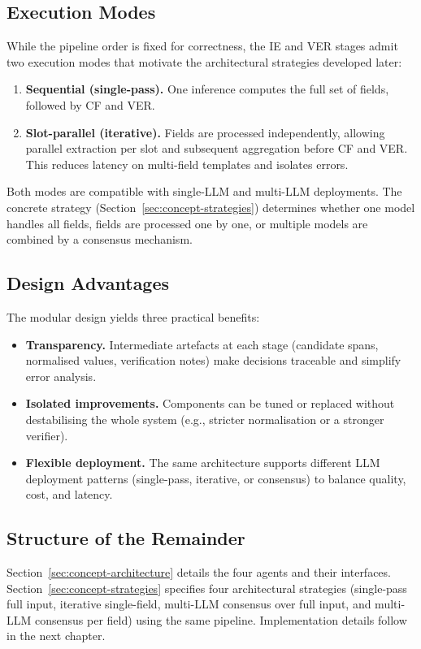 \subsection{Execution Modes}
While the pipeline order is fixed for correctness, the IE and VER stages admit two execution modes that motivate the architectural strategies developed later:
\begin{enumerate}
    \item \textbf{Sequential (single-pass).} One inference computes the full set of fields, followed by CF and VER.
    \item \textbf{Slot-parallel (iterative).} Fields are processed independently, allowing parallel extraction per slot and subsequent aggregation before CF and VER. This reduces latency on multi-field templates and isolates errors.
\end{enumerate}
Both modes are compatible with single-LLM and multi-LLM deployments. The concrete strategy (Section~\ref{sec:concept-strategies}) determines whether one model handles all fields, fields are processed one by one, or multiple models are combined by a consensus mechanism.

\subsection{Design Advantages}
The modular design yields three practical benefits:
\begin{itemize}
    \item \textbf{Transparency.} Intermediate artefacts at each stage (candidate spans, normalised values, verification notes) make decisions traceable and simplify error analysis.
    \item \textbf{Isolated improvements.} Components can be tuned or replaced without destabilising the whole system (e.g., stricter normalisation or a stronger verifier).
    \item \textbf{Flexible deployment.} The same architecture supports different LLM deployment patterns (single-pass, iterative, or consensus) to balance quality, cost, and latency.
\end{itemize}

\subsection{Structure of the Remainder}
Section~\ref{sec:concept-architecture} details the four agents and their interfaces. Section~\ref{sec:concept-strategies} specifies four architectural strategies (single-pass full input, iterative single-field, multi-LLM consensus over full input, and multi-LLM consensus per field) using the same pipeline. Implementation details follow in the next chapter.




